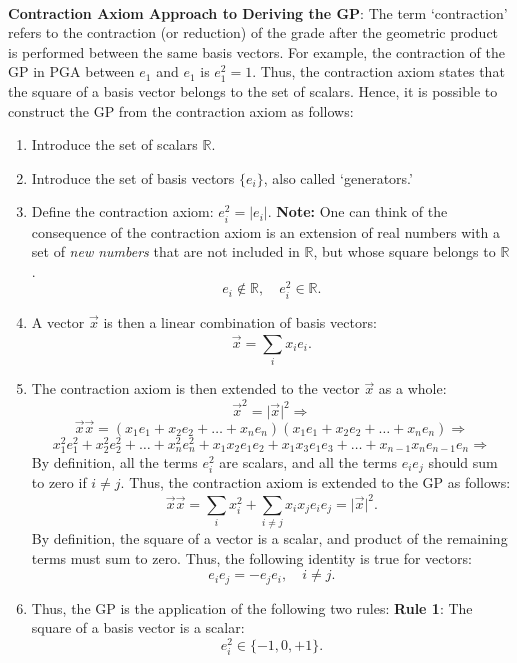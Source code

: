 \documentclass{article}
\begin{document}
\paragraph{}\textbf{Contraction Axiom Approach to Deriving the GP}: The term `contraction' refers to the 
contraction (or reduction) of the grade after the geometric product is performed between the same basis vectors.
For example, the contraction of the GP in PGA between $e_1$ and $e_1$ is $e_1^2 = 1$.
Thus, the contraction axiom states that the square of a basis vector belongs to the set of scalars.
Hence, it is possible to construct the GP from the contraction axiom as follows:
\begin{enumerate}
    \item Introduce the set of scalars $\mathbb{R}$.
    \item Introduce the set of basis vectors $\{e_i\}$, also called `generators.'
    \item Define the contraction axiom: $e_i^2 = \vert e_i \vert$. \textbf{Note:} One can think of the consequence of the 
    contraction axiom is an extension of real numbers 
    with a set of \textit{new numbers} that are not included in $\mathbb{R}$, but whose square belongs to $\mathbb{R}$.
    $$e_i \notin \mathbb{R}, \quad e_i^2 \in \mathbb{R}.$$
    \item A vector $\vec{x}$ is then a linear combination of basis vectors:
    $$\vec{x} = \sum_{i}^{} x_i e_i.$$
    \item The contraction axiom is then extended to the vector $\vec{x}$ as a whole:
    $$\vec{x}^2 = \vert \vec{x} \vert^2 \Rightarrow $$
    $$\vec{x}\vec{x} = (x_1 e_1 + x_2 e_2 + \ldots + x_n e_n)(x_1 e_1 + x_2 e_2 + \ldots + x_n e_n) \Rightarrow$$
    $$ x_1^2 e_1^2 + x_2^2 e_2^2 + \ldots + x_n^2 e_n^2 + x_1 x_2 e_1 e_2 + x_1 x_3 e_1 e_3 + \ldots + x_{n-1} x_n e_{n-1} e_n \Rightarrow$$
    By definition, all the terms $e_i^2$ are scalars, and all the terms $e_i e_j$ should sum to zero if $i \neq j$.
    Thus, the contraction axiom is extended to the GP as follows:
    $$\vec{x}\vec{x} = \sum_{i}^{} x_i^2 + \sum_{i \neq j}^{} x_i x_j e_i e_j = \vert \vec{x} \vert^2.$$
    By definition, the square of a vector is a scalar, and product of the remaining terms must sum to zero.
    Thus, the following identity is true for vectors:
    $$e_i e_j = -e_j e_i, \quad i \neq j.$$
    \item Thus, the GP is the application of the following two rules:
    \subitem \textbf{Rule 1}: The square of a basis vector is a scalar:
    $$e_i^2 \in \{-1, 0, +1\}.$$

\end{enumerate}
\end{document}
